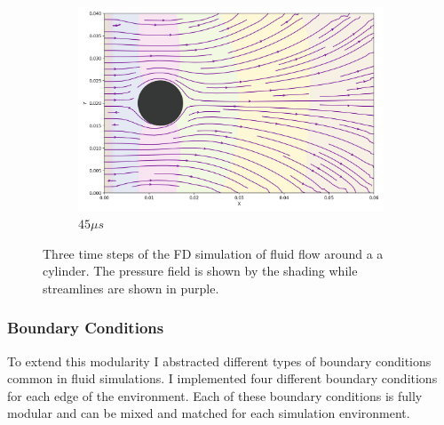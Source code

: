 \begin{figure}[!ht]
\begin{subfigure}{.3\textwidth}
        \includegraphics[width=\linewidth]{Figures/cylinder_example_timesteps/streamline09.png}
        \caption{$45 \mu s$}
        \label{fig:sub3}
    \end{subfigure}
    \caption{Three time steps of the FD simulation of fluid flow around a a cylinder. The pressure field is shown by the shading while streamlines are shown in purple.}
    \label{fig:fluid_flow_cylinder_ns_fdm}
\end{figure}


\subsubsection{Boundary Conditions}
To extend this modularity I abstracted different types of boundary conditions common in fluid simulations.
I implemented four different boundary conditions for each edge of the environment.
Each of these boundary conditions is fully modular and can be mixed and matched for each simulation environment.

